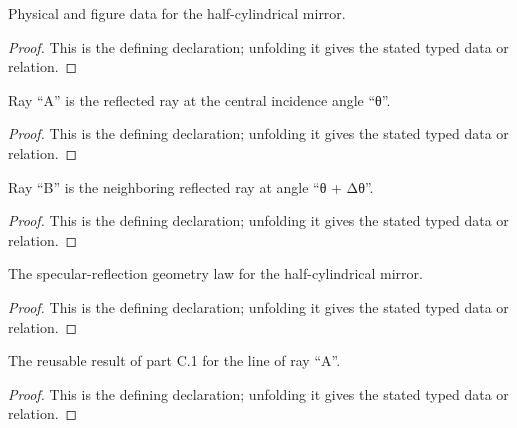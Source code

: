 \begin{definition}
  \label{decl:physics:IPhO_2026_2_C_2:Figure2gSetup}
  Physical and figure data for the half-cylindrical mirror.
\end{definition}
\begin{proof}
  This is the defining declaration; unfolding it gives the stated typed data or relation.
\end{proof}

\begin{definition}[rayA]
  \label{decl:physics:IPhO_2026_2_C_2:rayA}
  Ray “A” is the reflected ray at the central incidence angle “θ”.
\end{definition}
\begin{proof}
  This is the defining declaration; unfolding it gives the stated typed data or relation.
\end{proof}

\begin{definition}[rayB]
  \label{decl:physics:IPhO_2026_2_C_2:rayB}
  Ray “B” is the neighboring reflected ray at angle “θ + Δθ”.
\end{definition}
\begin{proof}
  This is the defining declaration; unfolding it gives the stated typed data or relation.
\end{proof}

\begin{definition}[HalfCylindricalReflectionLaw]
  \label{decl:physics:IPhO_2026_2_C_2:HalfCylindricalReflectionLaw}
  The specular-reflection geometry law for the half-cylindrical mirror.
\end{definition}
\begin{proof}
  This is the defining declaration; unfolding it gives the stated typed data or relation.
\end{proof}

\begin{definition}
  \label{decl:physics:IPhO_2026_2_C_2:PreviousPartC1Result}
  The reusable result of part C.1 for the line of ray “A”.
\end{definition}
\begin{proof}
  This is the defining declaration; unfolding it gives the stated typed data or relation.
\end{proof}

